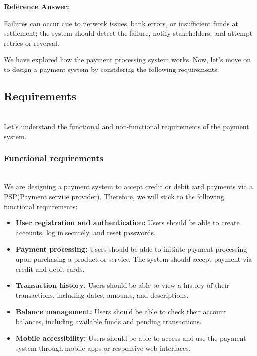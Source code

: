 \textbf{Reference Answer:}

Failures can occur due to network issues, bank errors, or insufficient funds at settlement; the system should detect the failure, notify stakeholders, and attempt retries or reversal.

We have explored how the payment processing system works. Now, let's move on to design a payment system by considering the following requirements:

\subsection{Requirements}\label{qsT7Ul-rpKucK8X_aHMnv}
\\
Let's understand the functional and non-functional requirements of the payment system.

\subsubsection{Functional requirements}\label{oMpJfx6XOSdl_oFZbhbAM}
\\
We are designing a payment system to accept credit or debit card payments via a PSP(Payment service provider). Therefore, we will stick to the following functional requirements:

\begin{itemize}
\item
\protect{}\label{97Cs178IPkL1pqJ9aiJ-Y}
\textbf{User registration and authentication:} Users should be able to create accounts, log in securely, and reset passwords.
\item
\protect{}\label{K-mlfx3vw_-geXIhiVSHd}
\textbf{Payment processing:} Users should be able to initiate payment processing upon purchasing a product or service. The system should accept payment via credit and debit cards.
\item
\protect{}\label{wenot0SHXd32tupmQX__l}
\textbf{Transaction history:} Users should be able to view a history of their transactions, including dates, amounts, and descriptions.
\item
\protect{}\label{m1PbJBFmq7m7a8RdVMwHs}
\textbf{Balance management:} Users should be able to check their account balances, including available funds and pending transactions.
\item
\protect{}\label{1LUI1RJnrhLUC2AChHA0k}
\textbf{Mobile accessibility:} Users should be able to access and use the payment system through mobile apps or responsive web interfaces.
\end{itemize}

